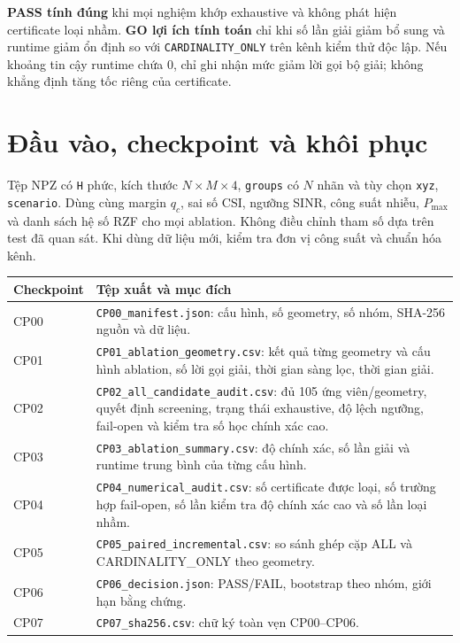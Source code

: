 \documentclass[onecolumn,11pt]{IEEEtran}
\begin{document}
\textbf{PASS tính đúng} khi mọi nghiệm khớp exhaustive và không phát hiện certificate loại nhầm. \textbf{GO lợi ích tính toán} chỉ khi số lần giải giảm bổ sung và runtime giảm ổn định so với \texttt{CARDINALITY\_ONLY} trên kênh kiểm thử độc lập. Nếu khoảng tin cậy runtime chứa 0, chỉ ghi nhận mức giảm lời gọi bộ giải; không khẳng định tăng tốc riêng của certificate.
\section{Đầu vào, checkpoint và khôi phục}
Tệp NPZ có \texttt{H} phức, kích thước $N\times M\times4$, \texttt{groups} có $N$ nhãn và tùy chọn \texttt{xyz}, \texttt{scenario}. Dùng cùng margin $q_c$, sai số CSI, ngưỡng SINR, công suất nhiễu, $P_{\max}$ và danh sách hệ số RZF cho mọi ablation. Không điều chỉnh tham số dựa trên test đã quan sát. Khi dùng dữ liệu mới, kiểm tra đơn vị công suất và chuẩn hóa kênh.

\small
\begin{longtable}{p{.10\linewidth}>{\raggedright\arraybackslash}p{.78\linewidth}}
\toprule Checkpoint & Tệp xuất và mục đích\\ \midrule\endhead
CP00 & \texttt{CP00\_manifest.json}: cấu hình, số geometry, số nhóm, SHA-256 nguồn và dữ liệu.\\
CP01 & \texttt{CP01\_ablation\_geometry.csv}: kết quả từng geometry và cấu hình ablation, số lời gọi giải, thời gian sàng lọc, thời gian giải.\\
CP02 & \texttt{CP02\_all\_candidate\_audit.csv}: đủ 105 ứng viên/geometry, quyết định screening, trạng thái exhaustive, độ lệch ngưỡng, fail-open và kiểm tra số học chính xác cao.\\
CP03 & \texttt{CP03\_ablation\_summary.csv}: độ chính xác, số lần giải và runtime trung bình của từng cấu hình.\\
CP04 & \texttt{CP04\_numerical\_audit.csv}: số certificate được loại, số trường hợp fail-open, số lần kiểm tra độ chính xác cao và số lần loại nhầm.\\
CP05 & \texttt{CP05\_paired\_incremental.csv}: so sánh ghép cặp ALL và CARDINALITY\_ONLY theo geometry.\\
CP06 & \texttt{CP06\_decision.json}: PASS/FAIL, bootstrap theo nhóm, giới hạn bằng chứng.\\
CP07 & \texttt{CP07\_sha256.csv}: chữ ký toàn vẹn CP00--CP06.\\ \bottomrule
\end{longtable}
\normalsize
\end{document}
